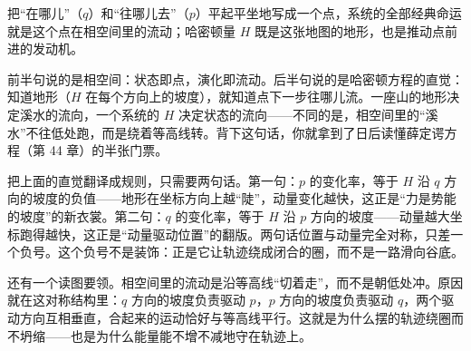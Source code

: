 
\begin{oneline}
把“在哪儿”（\(q\)）和“往哪儿去”（\(p\)）平起平坐地写成一个点，系统的全部经典命运就是这个点在相空间里的流动；哈密顿量 \(H\) 既是这张地图的地形，也是推动点前进的发动机。
\end{oneline}

前半句说的是相空间：状态即点，演化即流动。后半句说的是哈密顿方程的直觉：知道地形（\(H\) 在每个方向上的坡度），就知道点下一步往哪儿流。一座山的地形决定溪水的流向，一个系统的 \(H\) 决定状态的流向——不同的是，相空间里的“溪水”不往低处跑，而是绕着等高线转。背下这句话，你就拿到了日后读懂薛定谔方程（第 44 章）的半张门票。


\begin{mainline}
把上面的直觉翻译成规则，只需要两句话。第一句：\(p\) 的变化率，等于 \(H\) 沿 \(q\) 方向的坡度的负值——地形在坐标方向上越“陡”，动量变化越快，这正是“力是势能的坡度”的新衣裳。第二句：\(q\) 的变化率，等于 \(H\) 沿 \(p\) 方向的坡度——动量越大坐标跑得越快，这正是“动量驱动位置”的翻版。两句话位置与动量完全对称，只差一个负号。这个负号不是装饰：正是它让轨迹绕成闭合的圈，而不是一路滑向谷底。

还有一个读图要领。相空间里的流动是沿等高线“切着走”，而不是朝低处冲。原因就在这对称结构里：\(q\) 方向的坡度负责驱动 \(p\)，\(p\) 方向的坡度负责驱动 \(q\)，两个驱动方向互相垂直，合起来的运动恰好与等高线平行。这就是为什么摆的轨迹绕圈而不坍缩——也是为什么能量能不增不减地守在轨迹上。
\end{mainline}

